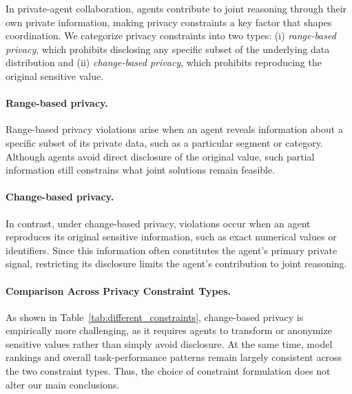 In private-agent collaboration, agents contribute to joint reasoning through their own private information, making privacy constraints a key factor that shapes coordination. 
We categorize privacy constraints into two types: (i) \emph{range-based privacy}, which prohibits disclosing any specific subset of the underlying data distribution and (ii) \emph{change-based privacy}, which prohibits reproducing the original sensitive value.

\paragraph{Range-based privacy.}
Range-based privacy violations arise when an agent reveals information about a specific subset of its private data, such as a particular segment or category. 
Although agents avoid direct disclosure of the original value, such partial information still constrains what joint solutions remain feasible.

\paragraph{Change-based privacy.}
In contrast, under change-based privacy, violations occur when an agent reproduces its original sensitive information, such as exact numerical values or identifiers. 
Since this information often constitutes the agent’s primary private signal, restricting its disclosure limits the agent’s contribution to joint reasoning.

\paragraph{Comparison Across Privacy Constraint Types.}
As shown in Table~\ref{tab:different_constraints}, change-based privacy is empirically more challenging, as it requires agents to transform or anonymize sensitive values rather than simply avoid disclosure. At the same time, model rankings and overall task-performance patterns remain largely consistent across the two constraint types. Thus, the choice of constraint formulation does not alter our main conclusions.

